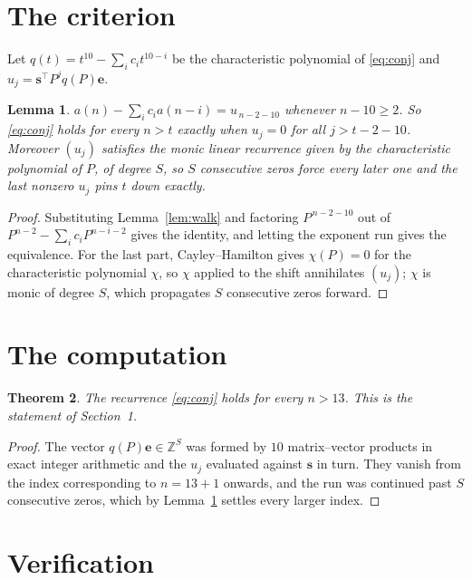\documentclass[11pt,a4paper]{article}
\theoremstyle{plain}
\newtheorem{theorem}{Theorem}
\newtheorem{lemma}[theorem]{Lemma}
\theoremstyle{definition}
\begin{document}
\section{The criterion}

Let $q(t)=t^{10}-\sum_i c_i t^{10-i}$ be the characteristic polynomial of
\eqref{eq:conj} and $u_j=\mathbf{s}^{\!\top}P^{j}q(P)\mathbf{e}$.

\begin{lemma}\label{lem:crit}
$a(n)-\sum_i c_i a(n-i)=u_{\,n-2-10}$ whenever $n-10\ge2$. So \eqref{eq:conj}
holds for every $n>t$ exactly when $u_j=0$ for all $j>t-2-10$. Moreover $(u_j)$
satisfies the monic linear recurrence given by the characteristic polynomial of $P$, of
degree $S$, so $S$ consecutive zeros force every later one and the last nonzero $u_j$ pins
$t$ down exactly.
\end{lemma}

\begin{proof}
Substituting Lemma~\ref{lem:walk} and factoring $P^{\,n-2-10}$ out of
$P^{n-2}-\sum_i c_i P^{n-i-2}$ gives the identity, and letting the exponent run gives the
equivalence. For the last part, Cayley--Hamilton gives $\chi(P)=0$ for the characteristic
polynomial $\chi$, so $\chi$ applied to the shift annihilates $(u_j)$; $\chi$ is monic of
degree $S$, which propagates $S$ consecutive zeros forward.
\end{proof}

\section{The computation}

\begin{theorem}
The recurrence \eqref{eq:conj} holds for every $n>13$. This is the statement of
Section~1.
\end{theorem}

\begin{proof}
The vector $q(P)\mathbf{e}\in\mathbb{Z}^{S}$ was formed by $10$ matrix--vector
products in exact integer arithmetic and the $u_j$ evaluated against $\mathbf{s}$ in turn.
They vanish from the index corresponding to $n=13+1$ onwards, and the run was continued
past $S$ consecutive zeros, which by Lemma~\ref{lem:crit} settles every larger index.
\end{proof}

\section{Verification}
\end{document}
